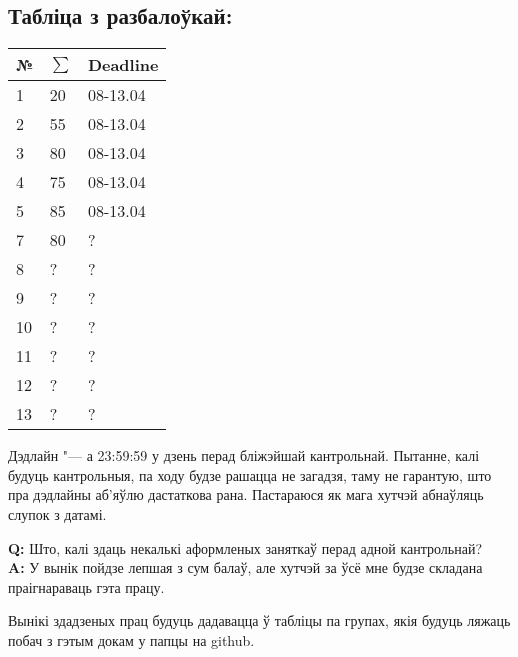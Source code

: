 \documentclass[12pt, a4paper]{extarticle}
\newcommand{\formQA}[2]{%
	\noindent \textbf{Q:} #1 \\
	\textbf{A:} #2
}
\begin{document}
	\subsection{Табліца з разбалоўкай:}
	\begin{table}[H]
		\begin{center}
			\begin{tabular}{|l|l|l|}
				\hline
				\bf №  & $\sum$ & \bf Deadline  \\ \hline
				1    & 20 & 08-13.04\\ \hline
				2   & 55 & 08-13.04 \\ \hline
				3   & 80 & 08-13.04 \\ \hline
				4   & 75 & 08-13.04 \\ \hline
				5   & 85 & 08-13.04 \\ \hline
				7   & 80 & ? \\ \hline
				8   & ? & ?  \\ \hline
				9   & ? & ?  \\ \hline
				10   & ? & ?  \\ \hline
				11   & ? & ?  \\ \hline
				12   & ? & ?  \\ \hline
				13   & ? & ?  \\ \hline
			\end{tabular}
		\end{center}
	\end{table}
	Дэдлайн "--- а 23:59:59 у дзень перад бліжэйшай кантрольнай. Пытанне, калі будуць кантрольныя, па ходу будзе рашацца не загадзя, таму не гарантую, што пра дэдлайны аб'яўлю дастаткова рана. Пастараюся як мага хутчэй абнаўляць слупок з датамі.
	
	\formQA{Што, калі здаць некалькі аформленых заняткаў перад адной кантрольнай?}
	{У вынік пойдзе лепшая з сум балаў, але хутчэй за ўсё мне будзе складана праігнараваць гэта працу.}
	
	Вынікі здадзеных прац будуць дадавацца ў табліцы па групах, якія будуць ляжаць побач з гэтым докам у папцы на github.
\end{document}
